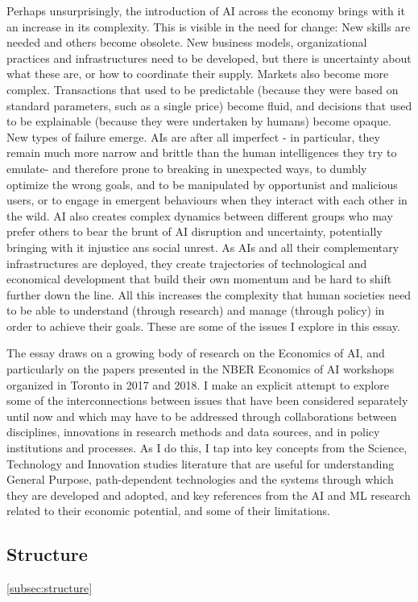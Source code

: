 \documentclass[11pt]{article}
\begin{document}
Perhaps unsurprisingly, the introduction of AI across the economy brings with it an increase in its complexity. This is visible in the need for change: New skills are needed and others become obsolete. New business models, organizational practices and infrastructures need to be developed, but there is uncertainty about what these are, or how to coordinate their supply. Markets also become more complex. Transactions that used to be predictable (because they were based on standard parameters, such as a single price) become fluid, and decisions that used to be explainable (because they were undertaken by humans) become opaque. New types of failure emerge.  AIs are after all imperfect - in particular, they remain much more narrow and brittle than the human intelligences they try to emulate- and therefore prone to breaking in unexpected ways, to dumbly optimize the wrong goals, and to be manipulated by opportunist and malicious users, or to engage in emergent behaviours when they interact with each other in the wild. AI also creates complex dynamics between different groups who may prefer others to bear the brunt of AI disruption and uncertainty, potentially bringing with it injustice ans social unrest. As AIs and all their complementary infrastructures are deployed, they create trajectories of technological and economical development that build their own momentum and be hard to shift further down the line. All this increases the complexity that human societies need to be able to understand (through research) and manage (through policy) in order to achieve their goals. These are some of the issues I explore in this essay.  

The essay draws on a growing body of research on the Economics of AI, and particularly on the papers presented in the NBER Economics of AI workshops organized in Toronto in 2017 and 2018. I make an explicit attempt to explore some of the interconnections between issues that have been considered separately until now and which may have to be addressed through collaborations between disciplines, innovations in research methods and data sources, and in policy institutions and processes. As I do this, I tap into key concepts from the Science, Technology and Innovation studies literature that are useful for understanding General Purpose, path-dependent technologies and the systems through which they are developed and adopted, and key references from the AI and ML research related to their economic potential, and some of their limitations. 

\subsection{Structure}
\ref{subsec:structure}
\end{document}
